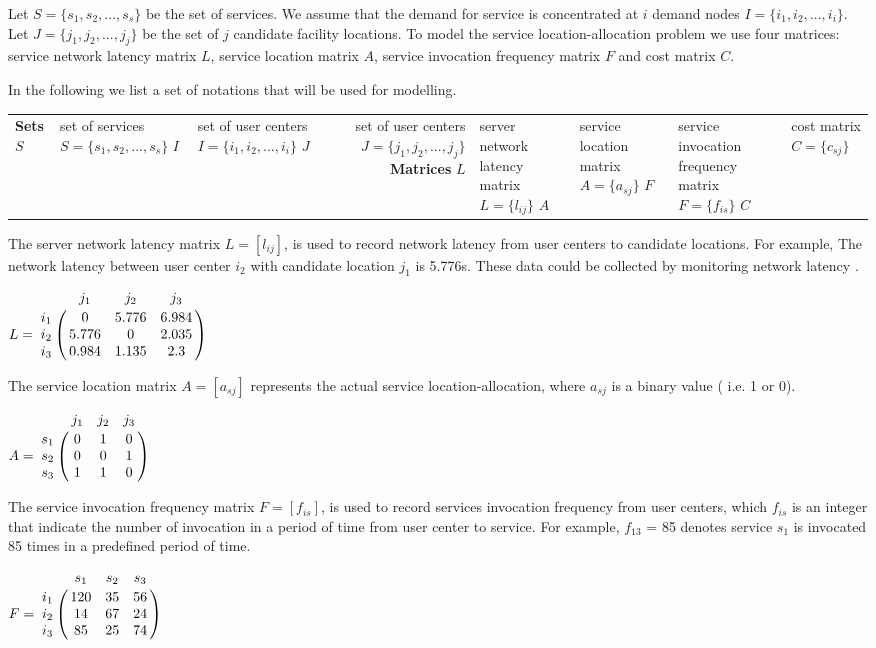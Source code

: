 \documentclass{llncs}
\let\bbordermatrix\bordermatrix
\begin{document}
Let $S = \{ s_{1}, s_{2}, ..., s_{s}\}$ be the set of services. We assume that the demand for service is concentrated at $i$ 
demand nodes $I = \{ i_{1}, i_{2}, ..., i_{i} \}$. Let $J = \{ j_{1}, j_{2}, ..., j_{j} \}$ be the set of $j$ candidate facility locations.
To model the service location-allocation problem we use four matrices: service network latency matrix $L$, service location
matrix $A$, service invocation frequency matrix $F$ and cost matrix $C$.

In the following we list a set of notations that will be used for modelling. 
\begin{center}
	\begin{tabular}{l*{2}{l}r}
		\hline
		\textbf{Sets} \cr
		$S$	& set of services $S = \{s_{1}, s_{2}, ..., s_{s}\}$ \cr
		$I$	& set of user centers $I = \{i_{1}, i_{2}, ..., i_{i}\}$ \cr
		$J$	& set of user centers $J = \{j_{1}, j_{2}, ..., j_{j}\}$ \cr
		\textbf{Matrices} \cr
		$L$ & server network latency matrix $L = \{l_{ij}\}$ \cr
		$A$ & service location matrix $A = \{a_{sj}\}$ \cr
		$F$ & service invocation frequency matrix $F = \{f_{is}\}$ \cr
		$C$ & cost matrix $C = \{c_{sj}\}$ \cr
		\hline
	\end{tabular}
\end{center}

The server network latency matrix $L = [l_{ij}]$, is used to record network latency from user centers to 
candidate locations. For example, The network latency between user center $i_{2}$ with candidate location $j_{1}$ 
is 5.776s. These data could be collected by monitoring network latency \cite{6076756} \cite{5552800}.
\begin{center}
$
L = \bbordermatrix{~ & j_{1} & j_{2} & j_{3} \cr
					i_{1}	&0 &5.776 &6.984	\cr
					i_{2}	&5.776  &0 &2.035 \cr
					i_{3}	&0.984 &1.135	&2.3 \cr} 
$
\end{center}
The service location matrix $A = [a_{sj}]$ represents the actual service location-allocation, where $a_{sj}$  is a binary value ( i.e. 1 or 0).
\begin{center}
$
A = \bbordermatrix{~ & j_{1} & j_{2} & j_{3}\cr
					s_{1}	&0 &1 &0	\cr
					s_{2}	&0  &0 &1	\cr
					s_{3}	&1 &1 &0	\cr} 
$
\end{center}

The service invocation frequency matrix $F= [f_{is}]$, is used to record services invocation frequency from user centers, 
which $f_{is}$ is an integer that indicate the number of invocation in a period of time from user center to service. 
For example, $f_{13}$ = 85 denotes service $s_{1}$ is invocated 85 times in a predefined period of time.
\begin{center}
$
F = \bbordermatrix{~ & s_{1} & s_{2} & s_{3}  \cr
					i_{1}	&120 &35 &56	\cr
					i_{2}	&14  &67 &24 \cr
					i_{3}	&85 &25 &74 \cr} 
$
\end{center}
\end{document}
